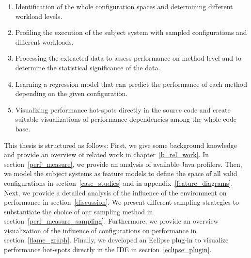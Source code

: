 \begin{enumerate}
	\item Identification of the whole configuration spaces and determining different workload levels.
	\item Profiling the execution of the subject system with sampled configurations and different workloads.
	\item Processing the extracted data to assess performance on method level and to determine the statistical significance of the data.
	\item Learning a regression model that can predict the performance of each method depending on the given configuration.
	\item Visualizing performance hot-spots directly in the source code and create suitable visualizations of performance dependencies among the whole code base.
\end{enumerate}



This thesis is structured as follows:
First, we give some background knowledge and provide an overview of related work in chapter~\ref{b_rel_work}.
In section~\ref{perf_measure}, we provide an analysis of available Java profilers.
Then, we model the subject systems as feature models to define the space of all valid configurations in section~\ref{case_studies} and in appendix~\ref{feature_diagrams}. 
Next, we provide a detailed analysis of the influence of the environment on performance in section~\ref{discussion}. 
We present different sampling strategies to substantiate the choice of our sampling method in section~\ref{perf_measure_sampling}. 
Furthermore, we provide an overview visualization of the influence of configurations on performance in section~\ref{flame_graph}. 
Finally, we developed an Eclipse plug-in to visualize performance hot-spots directly in the \ac{IDE} in section~\ref{eclipse_plugin}.

